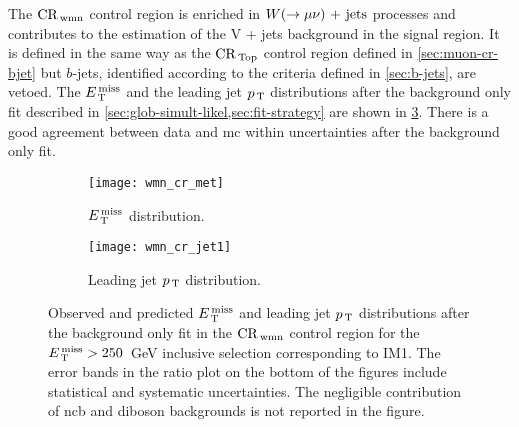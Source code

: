 The $\mathrm{CR}_\mathrm{\, wmn}$ control region is enriched in $W (\rightarrow \mu \nu)\mathrm{~+~jets}$ processes and
contributes to the estimation of the V + jets background in the signal
region. It is defined in the same way as the $\mathrm{CR}_\mathrm{\, Top}$ control region defined in
\cref{sec:muon-cr-bjet} but $b$-jets, identified according to the criteria
defined in \cref{sec:b-jets}, are vetoed. The $E_\mathrm{\, T}^\mathrm{\, miss}$ and the leading jet $p_\mathrm{\, T}$
distributions after the background only fit described in
\cref{sec:glob-simult-likel,sec:fit-strategy} are shown in
\cref{fig:wmn_plots}.
There is a good agreement between data and \gls{mc} within
uncertainties after the background only fit.
\begin{figure}[!htb]
  \centering
  \begin{subfigure}[t]{.48\linewidth}
    \texttt{[image: wmn\_cr\_met]}
    \caption{$E_\mathrm{\, T}^\mathrm{\, miss}$ distribution.}
    \label{fig:wmn_cr_et_miss}
  \end{subfigure}
  \begin{subfigure}[t]{.48\linewidth}
    \texttt{[image: wmn\_cr\_jet1]}
    \caption{Leading jet $p_\mathrm{\, T}$ distribution.}
    \label{fig:wmn_cr_jet1}
  \end{subfigure}
  \caption{Observed and predicted $E_\mathrm{\, T}^\mathrm{\, miss}$ and leading jet $p_\mathrm{\, T}$ distributions
    after the background only fit in the $\mathrm{CR}_\mathrm{\, wmn}$ control region for the
    $E_\mathrm{\, T}^\mathrm{\, miss} > 250$~GeV inclusive selection corresponding to IM1. The error bands
    in the ratio plot on the bottom of the figures include statistical and
    systematic uncertainties. The negligible contribution of \gls{ncb} and
    diboson backgrounds is not reported in the figure.}
  \label{fig:wmn_plots}
\end{figure}
\pagebreak[4]
